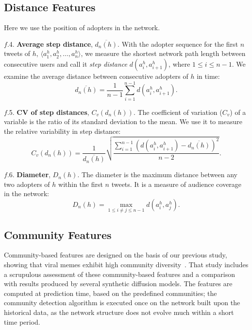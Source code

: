 \documentclass[letterpaper]{article}
\begin{document}
\subsection{Distance Features}

Here we use the position of adopters in the network. 


\noindent $f$.4. \textbf{Average step distance}, $\overline{d_n(h)}$.  With the
adopter sequence for the first $n$ tweets of $h$, $\langle
a_1^h, a_2^h, \dots, a_n^h \rangle$, we measure the 
shortest network path length between consecutive users  
and call it \emph{step distance} $d(a_i^h, a_{i+1}^h)$, where $1 \leq
i \leq n-1$. 
We examine the average distance between consecutive adopters of $h$ in time:
%
\begin{equation*}
%
\overline{d_n(h)} = \frac{1}{n-1} \sum_{i=1}^{n-1} d(a_i^h, a_{i+1}^h).
%
\end{equation*}


\noindent $f$.5. \textbf{CV of step distances}, $C_v(d_n(h))$.  The coefficient of
variation ($C_v$) of a variable is the ratio of its standard deviation to the
mean. We use it to measure the relative variability in step distance:
%
\begin{equation*}
%
C_v(d_n(h)) = \frac{1}{\overline{d_n(h)}} \sqrt{\frac{\sum_{i=1}^{n-1}(d(a_i^h,
a_{i+1}^h) - \overline{d_n(h)})^2}{n-2}}.
%
\end{equation*}


\noindent $f$.6. \textbf{Diameter}, $D_n(h)$.  The diameter is the maximum
distance between any two adopters of $h$ within the first $n$ tweets.  
It is a measure of audience coverage in the network:
%
\begin{equation*}
%
D_n(h) = \max_{1 \leq i \neq j \leq n-1} d(a_i^h, a_j^h).
%
\end{equation*}



\subsection{Community Features}

Community-based features are designed on the basis of our previous study, showing that viral memes exhibit high community diversity~\cite{colbaugh2012early,weng2013viral}. That study includes a scrupulous assessment of these community-based features and a comparison with results produced by several synthetic diffusion models.
The features are computed at prediction time, based on the predefined communities; the community detection algorithm is executed once on the network built upon the historical data, as the network structure does not evolve much within a short time period.
\end{document}
